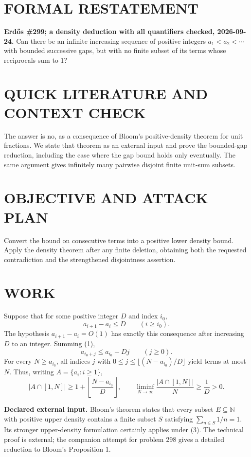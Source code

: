 \section{FORMAL RESTATEMENT}
\textbf{Erd\H{o}s \#299; a density deduction with all quantifiers checked, 2026-09-24.}
Can there be an infinite increasing sequence of positive integers $a_1<a_2<\cdots$ with bounded successive gaps, but with no finite subset of its terms whose reciprocals sum to $1$?

\section{QUICK LITERATURE AND CONTEXT CHECK}
The answer is no, as a consequence of Bloom's positive-density theorem for unit fractions. We state that theorem as an external input and prove the bounded-gap reduction, including the case where the gap bound holds only eventually. The same argument gives infinitely many pairwise disjoint finite unit-sum subsets.

\section{OBJECTIVE AND ATTACK PLAN}
Convert the bound on consecutive terms into a positive lower density bound. Apply the density theorem after any finite deletion, obtaining both the requested contradiction and the strengthened disjointness assertion.

\section{WORK}
Suppose that for some positive integer $D$ and index $i_0$,
\[
a_{i+1}-a_i\leq D\qquad(i\geq i_0).
\tag{1}
\]
The hypothesis $a_{i+1}-a_i=O(1)$ has exactly this consequence after increasing $D$ to an integer. Summing (1),
\[
a_{i_0+j}\leq a_{i_0}+Dj\qquad(j\geq0).
\tag{2}
\]
For every $N\geq a_{i_0}$, all indices $j$ with $0\leq j\leq\lfloor(N-a_{i_0})/D\rfloor$ yield terms at most $N$. Thus, writing $A=\{a_i:i\geq1\}$,
\[
|A\cap[1,N]|\geq1+\left\lfloor\frac{N-a_{i_0}}D\right\rfloor,
\qquad
\liminf_{N\to\infty}\frac{|A\cap[1,N]|}{N}\geq\frac1D>0.
\tag{3}
\]

\textbf{Declared external input.} Bloom's theorem states that every subset $E\subseteq\mathbb N$ with positive upper density contains a finite subset $S$ satisfying $\sum_{n\in S}1/n=1$. Its stronger upper-density formulation certainly applies under (3). The technical proof is external; the companion attempt for problem 298 gives a detailed reduction to Bloom's Proposition 1.


